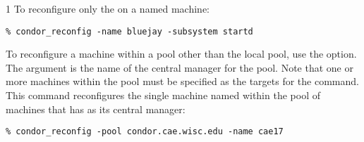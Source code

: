 \begin{ManPage}{\label{man-condor-reconfig}}{1}
To reconfigure only the  on a named machine:
\begin{verbatim}
% condor_reconfig -name bluejay -subsystem startd
\end{verbatim}

To reconfigure a machine within a pool
other than the local pool, use the  option.
The argument is the name of the central manager for the pool.
Note that one or more machines within the pool must be
specified as the targets for the command.
This command reconfigures
the single machine named  within the
pool of machines that has  as
its central manager:
\begin{verbatim}
% condor_reconfig -pool condor.cae.wisc.edu -name cae17
\end{verbatim}

\end{ManPage}

